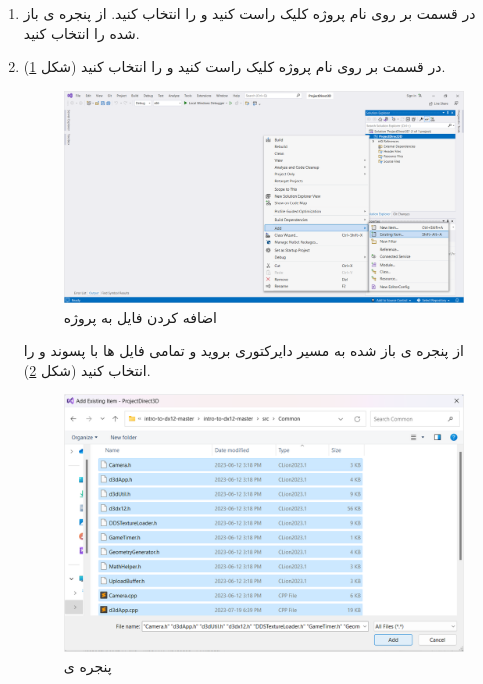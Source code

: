 {\begin{spacing}{1.3}
        \begin{enumerate}
            \item {در قسمت  بر روی نام پروژه کلیک راست کنید و  را انتخاب کنید.
            از پنجره ی باز شده  را انتخاب کنید.   }

            \item {در قسمت  بر روی نام پروژه کلیک راست کنید و  را انتخاب کنید (شکل \ref{fig:3.Intro.5.9.2}).

                \begin{figure}[H]
                    \centering
                    \setlength{\belowcaptionskip}{-10pt}
                    \includegraphics[width=\textwidth]{Images/3/3.Intro.5.9.2}
                    \caption{اضافه کردن فایل به پروژه}
                    \label{fig:3.Intro.5.9.2}
                \end{figure}

                از پنجره ی باز شده به مسیر دایرکتوری  بروید و تمامی فایل ها با پسوند  و  را انتخاب کنید  (شکل \ref{fig:3.Intro.5.9.3}).

                \begin{figure}[H]
                    \centering
                    \setlength{\belowcaptionskip}{-10pt}
                    \includegraphics[width=\textwidth]{Images/3/3.Intro.5.9.3}
                    \caption{پنجره ی }
                    \label{fig:3.Intro.5.9.3}
                \end{figure}

}
\end{enumerate}
\end{spacing}}

